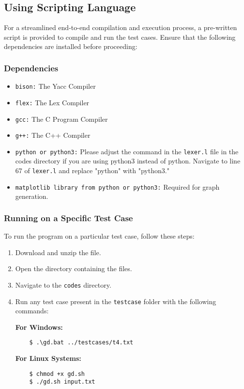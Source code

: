 \documentclass{article}
\begin{document}
\subsection{Using Scripting Language}

For a streamlined end-to-end compilation and execution process, a pre-written script is provided to compile and run the test cases. Ensure that the following dependencies are installed before proceeding:

\subsubsection{Dependencies}
\begin{itemize}
    \item \texttt{bison:} The Yacc Compiler
    \item \texttt{flex:} The Lex Compiler
    \item \texttt{gcc:} The C Program Compiler
    \item \texttt{g++:} The C++ Compiler
    \item \texttt{python or python3:} Please adjust the command in the \texttt{lexer.l} file in the codes directory if you are using python3 instead of python. Navigate to line 67 of \texttt{lexer.l} and replace "python" with "python3."
    \item \texttt{matplotlib library from python or python3:} Required for graph generation.
\end{itemize}

\subsubsection{Running on a Specific Test Case}

To run the program on a particular test case, follow these steps:

\begin{enumerate}
    \item Download and unzip the file.
    \item Open the directory containing the files.
    \item Navigate to the \texttt{codes} directory.
    \item Run any test case present in the \texttt{testcase} folder with the following commands:

    \textbf{For Windows:}
    \begin{verbatim}
    $ .\gd.bat ../testcases/t4.txt
    \end{verbatim}

    \textbf{For Linux Systems:}
    \begin{verbatim}
    $ chmod +x gd.sh
    $ ./gd.sh input.txt
    \end{verbatim}
\end{enumerate}
\end{document}
